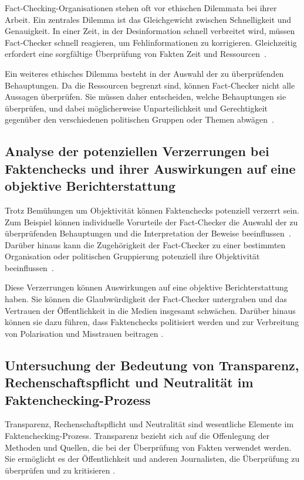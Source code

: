 \documentclass[a4paper,listof=totoc,bibliography=totoc]{scrartcl}
\begin{document}
Fact-Checking-Organisationen stehen oft vor ethischen Dilemmata bei ihrer Arbeit. Ein zentrales Dilemma 
ist das Gleichgewicht zwischen Schnelligkeit und Genauigkeit. In einer Zeit, in der Desinformation schnell 
verbreitet wird, müssen Fact-Checker schnell reagieren, um Fehlinformationen zu korrigieren. Gleichzeitig 
erfordert eine sorgfältige Überprüfung von Fakten Zeit und Ressourcen~\cite{amazeen2018}. 

Ein weiteres ethisches Dilemma besteht in der Auswahl der zu überprüfenden Behauptungen. Da die Ressourcen 
begrenzt sind, können Fact-Checker nicht alle Aussagen überprüfen. Sie müssen daher entscheiden, welche 
Behauptungen sie überprüfen, und dabei möglicherweise Unparteilichkeit und Gerechtigkeit gegenüber den 
verschiedenen politischen Gruppen oder Themen abwägen~\cite{graves2016}. 

\subsection{Analyse der potenziellen Verzerrungen bei Faktenchecks und ihrer Auswirkungen auf eine objektive Berichterstattung}

Trotz Bemühungen um Objektivität können Faktenchecks potenziell verzerrt sein. Zum Beispiel können 
individuelle Vorurteile der Fact-Checker die Auswahl der zu überprüfenden Behauptungen und die 
Interpretation der Beweise beeinflussen~\cite{nyhan2010}. Darüber hinaus kann die Zugehörigkeit 
der Fact-Checker zu einer bestimmten Organisation oder politischen Gruppierung potenziell ihre 
Objektivität beeinflussen~\cite{graves2016}.

Diese Verzerrungen können Auswirkungen auf eine objektive Berichterstattung haben. 
Sie können die Glaubwürdigkeit der Fact-Checker untergraben und das Vertrauen der Öffentlichkeit 
in die Medien insgesamt schwächen. Darüber hinaus können sie dazu führen, dass Faktenchecks 
politisiert werden und zur Verbreitung von Polarisation und Misstrauen beitragen \cite{amazeen2018}.

\subsection{Untersuchung der Bedeutung von Transparenz, Rechenschaftspflicht und Neutralität im Faktenchecking-Prozess}

Transparenz, Rechenschaftspflicht und Neutralität sind wesentliche Elemente im Faktenchecking-Prozess. Transparenz bezieht sich auf die Offenlegung der Methoden und Quellen, die bei der Überprüfung von Fakten verwendet werden. Sie ermöglicht es der Öffentlichkeit und anderen Journalisten, die Überprüfung zu überprüfen und zu kritisieren \cite{graves2018}. 
\end{document}
